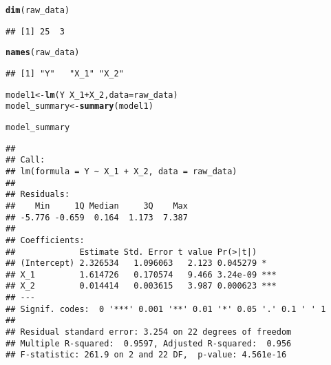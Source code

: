 \documentclass[11pt, a4paper]{article}\usepackage[]{graphicx}\usepackage[]{xcolor}
\makeatletter
\newcommand{\hlopt}[1]{\textcolor[rgb]{0,0,0}{#1}}%
\newcommand{\hldef}[1]{\textcolor[rgb]{0.345,0.345,0.345}{#1}}%
\newcommand{\hlkwb}[1]{\textcolor[rgb]{0.69,0.353,0.396}{#1}}%
\newcommand{\hlkwc}[1]{\textcolor[rgb]{0.333,0.667,0.333}{#1}}%
\newcommand{\hlkwd}[1]{\textcolor[rgb]{0.737,0.353,0.396}{\textbf{#1}}}%
\newenvironment{kframe}{%
 \def\at@end@of@kframe{}%
 \ifinner\ifhmode%
  \def\at@end@of@kframe{\end{minipage}}%
  \begin{minipage}{\columnwidth}%
 \fi\fi%
 \def\FrameCommand##1{\hskip\@totalleftmargin \hskip-\fboxsep
 \colorbox{shadecolor}{##1}\hskip-\fboxsep
     \hskip-\linewidth \hskip-\@totalleftmargin \hskip\columnwidth}%
 \MakeFramed {\advance\hsize-\width
   \@totalleftmargin\z@ \linewidth\hsize
   \@setminipage}}%
 {\par\unskip\endMakeFramed%
 \at@end@of@kframe}
\newenvironment{knitrout}{}{} %
\makeatother
\begin{document}
\begin{knitrout}
\color{fgcolor}\begin{kframe}
\begin{alltt}
\hlkwd{dim}\hldef{(raw_data)}
\end{alltt}
\begin{verbatim}
## [1] 25  3
\end{verbatim}
\end{kframe}
\end{knitrout}

\begin{knitrout}
\color{fgcolor}\begin{kframe}
\begin{alltt}
\hlkwd{names}\hldef{(raw_data)}
\end{alltt}
\begin{verbatim}
## [1] "Y"   "X_1" "X_2"
\end{verbatim}
\end{kframe}
\end{knitrout}

\begin{knitrout}
\color{fgcolor}\begin{kframe}
\begin{alltt}
\hldef{model1} \hlkwb{<-} \hlkwd{lm}\hldef{(Y} \hlopt{~} \hldef{X_1} \hlopt{+} \hldef{X_2,} \hlkwc{data} \hldef{= raw_data)}
\hldef{model_summary} \hlkwb{<-} \hlkwd{summary}\hldef{(model1)}
\end{alltt}
\end{kframe}
\end{knitrout}

\begin{knitrout}
\color{fgcolor}\begin{kframe}
\begin{alltt}
\hldef{model_summary}
\end{alltt}
\begin{verbatim}
## 
## Call:
## lm(formula = Y ~ X_1 + X_2, data = raw_data)
## 
## Residuals:
##    Min     1Q Median     3Q    Max 
## -5.776 -0.659  0.164  1.173  7.387 
## 
## Coefficients:
##             Estimate Std. Error t value Pr(>|t|)    
## (Intercept) 2.326534   1.096063   2.123 0.045279 *  
## X_1         1.614726   0.170574   9.466 3.24e-09 ***
## X_2         0.014414   0.003615   3.987 0.000623 ***
## ---
## Signif. codes:  0 '***' 0.001 '**' 0.01 '*' 0.05 '.' 0.1 ' ' 1
## 
## Residual standard error: 3.254 on 22 degrees of freedom
## Multiple R-squared:  0.9597,	Adjusted R-squared:  0.956 
## F-statistic: 261.9 on 2 and 22 DF,  p-value: 4.561e-16
\end{verbatim}
\end{kframe}
\end{knitrout}
\end{document}

